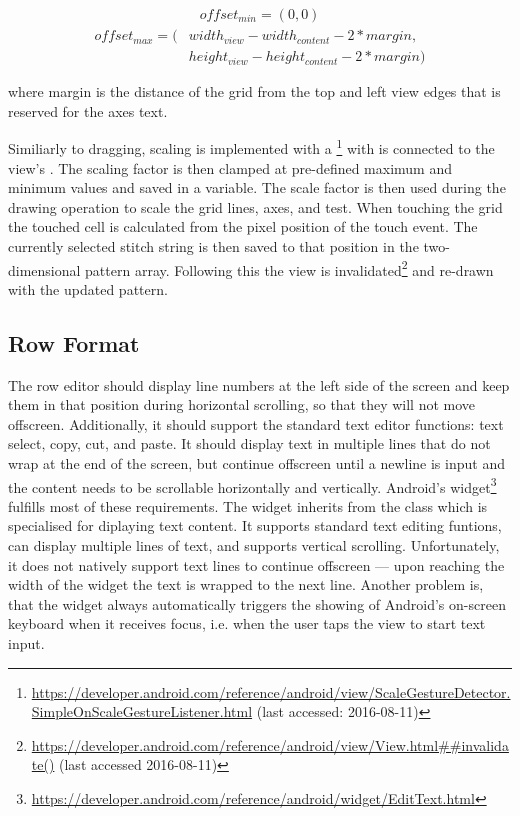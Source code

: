 \begin{gather*}
offset_{min} = (0, 0)
\end{gather*}
\begin{align*}
offset_{max} = (&width_{view} - width_{content} - 2 * margin, \\
				&height_{view} - height_{content} - 2 * margin)
\end{align*}

where margin is the distance of the grid from the top and left view edges that is reserved for the axes text.

Similiarly to dragging, scaling is implemented with a \footnote{\url{https://developer.android.com/reference/android/view/ScaleGestureDetector.SimpleOnScaleGestureListener.html} (last accessed: 2016-08-11)} with is connected to the view's . The scaling factor is then clamped at pre-defined maximum and minimum values and saved in a variable. The scale factor is then used during the drawing operation to scale the grid lines, axes, and test. When touching the grid the touched cell is calculated from the pixel position of the touch event. The currently selected stitch string is then saved to that position in the two-dimensional pattern array. Following this the view is invalidated\footnote{\url{https://developer.android.com/reference/android/view/View.html##invalidate()} (last accessed 2016-08-11)} and re-drawn with the updated pattern.   

\subsection{Row Format}
\label{impl_row_format}
The row editor should display line numbers at the left side of the screen and keep them in that position during horizontal scrolling, so that they will not move offscreen. Additionally, it should support the standard text editor functions: text select, copy, cut, and paste. It should display text in multiple lines that do not wrap at the end of the screen, but continue offscreen until a newline is input and the content needs to be scrollable horizontally and vertically. Android's  widget\footnote{\url{https://developer.android.com/reference/android/widget/EditText.html}} fulfills most of these requirements. The  widget inherits from the class  which is specialised for diplaying text content. It supports standard text editing funtions, can display multiple lines of text, and supports vertical scrolling. Unfortunately, it does not natively support text lines to continue offscreen --- upon reaching the width of the widget the text is wrapped to the next line. Another problem is, that the widget always automatically triggers the showing of Android's on-screen keyboard when it receives focus, i.e. when the user taps the view to start text input. 

